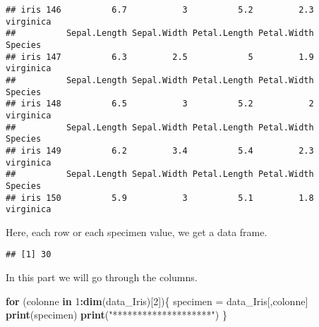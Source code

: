 \documentclass[
]{article}
\newenvironment{Shaded}{\begin{snugshade}}{\end{snugshade}}
\newcommand{\ControlFlowTok}[1]{\textcolor[rgb]{0.13,0.29,0.53}{\textbf{#1}}}
\newcommand{\DecValTok}[1]{\textcolor[rgb]{0.00,0.00,0.81}{#1}}
\newcommand{\FunctionTok}[1]{\textcolor[rgb]{0.13,0.29,0.53}{\textbf{#1}}}
\newcommand{\NormalTok}[1]{#1}
\newcommand{\OtherTok}[1]{\textcolor[rgb]{0.56,0.35,0.01}{#1}}
\newcommand{\SpecialCharTok}[1]{\textcolor[rgb]{0.81,0.36,0.00}{\textbf{#1}}}
\newcommand{\StringTok}[1]{\textcolor[rgb]{0.31,0.60,0.02}{#1}}
\begin{document}
\begin{verbatim}
## iris 146          6.7           3          5.2         2.3 virginica
##          Sepal.Length Sepal.Width Petal.Length Petal.Width   Species
## iris 147          6.3         2.5            5         1.9 virginica
##          Sepal.Length Sepal.Width Petal.Length Petal.Width   Species
## iris 148          6.5           3          5.2           2 virginica
##          Sepal.Length Sepal.Width Petal.Length Petal.Width   Species
## iris 149          6.2         3.4          5.4         2.3 virginica
##          Sepal.Length Sepal.Width Petal.Length Petal.Width   Species
## iris 150          5.9           3          5.1         1.8 virginica
\end{verbatim}

Here, each row or each specimen value, we get a data frame.

\begin{Shaded}
\end{Shaded}

\begin{verbatim}
## [1] 30
\end{verbatim}

In this part we will go through the columns.

\begin{Shaded}
\begin{Highlighting}[]
\ControlFlowTok{for}\NormalTok{ (colonne }\ControlFlowTok{in} \DecValTok{1}\SpecialCharTok{:}\FunctionTok{dim}\NormalTok{(data\_Iris)[}\DecValTok{2}\NormalTok{])\{}
\NormalTok{  specimen }\OtherTok{=}\NormalTok{ data\_Iris[,colonne]}
  \FunctionTok{print}\NormalTok{(specimen)}
  \FunctionTok{print}\NormalTok{(}\StringTok{"********************"}\NormalTok{)}
\NormalTok{\}}
\end{Highlighting}
\end{Shaded}
\end{document}

